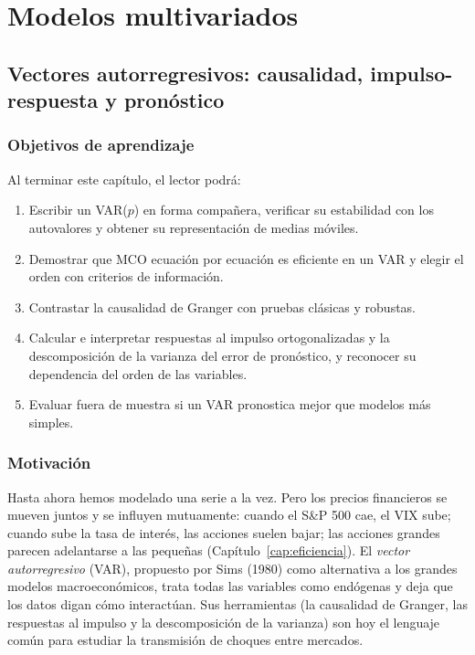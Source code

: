 \part{Modelos multivariados}
\chapter[Vectores autorregresivos]{Vectores autorregresivos: causalidad, impulso-respuesta y pronóstico}\label{cap:var}

\section*{Objetivos de aprendizaje}
Al terminar este capítulo, el lector podrá:
\begin{enumerate}[label=\arabic*.,leftmargin=*]
  \item Escribir un VAR($p$) en forma compañera, verificar su estabilidad con los autovalores y obtener su
        representación de medias móviles.
  \item Demostrar que MCO ecuación por ecuación es eficiente en un VAR y elegir el orden con criterios de
        información.
  \item Contrastar la causalidad de Granger con pruebas clásicas y robustas.
  \item Calcular e interpretar respuestas al impulso ortogonalizadas y la descomposición de la varianza del
        error de pronóstico, y reconocer su dependencia del orden de las variables.
  \item Evaluar fuera de muestra si un VAR pronostica mejor que modelos más simples.
\end{enumerate}

\section*{Motivación}
Hasta ahora hemos modelado una serie a la vez. Pero los precios financieros se mueven juntos y se influyen
mutuamente: cuando el S\&P 500 cae, el VIX sube; cuando sube la tasa de interés, las acciones suelen bajar; las
acciones grandes parecen adelantarse a las pequeñas (Capítulo~\ref{cap:eficiencia}). El \emph{vector
autorregresivo} (VAR), propuesto por Sims (1980) como alternativa a los grandes modelos macroeconómicos, trata
todas las variables como endógenas y deja que los datos digan cómo interactúan. Sus herramientas (la
causalidad de Granger, las respuestas al impulso y la descomposición de la varianza) son hoy el lenguaje común
para estudiar la transmisión de choques entre mercados.

